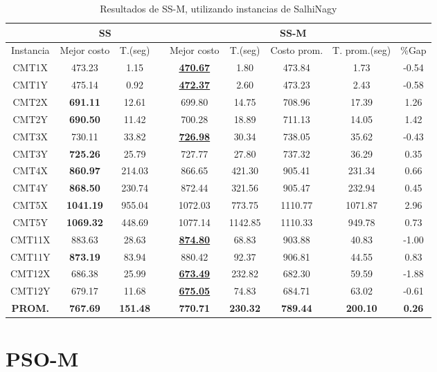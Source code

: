 \begin{table}[h]
\caption{ Resultados de SS-M, utilizando instancias de SalhiNagy}
\centering
\scriptsize
\begin{tabular*}{1.00\textwidth}{@{\extracolsep{\fill}} |c||c c||c c c c c c|}
\hline
 & \multicolumn{2}{c||}{\bf{SS}} & \multicolumn{6}{c|}{\bf{SS-M}}\\\hline
Instancia & Mejor costo & T.(seg) & & Mejor costo & T.(seg) & Costo prom. & T. prom.(seg) & \%Gap\\ [0.5ex]
\hline\hline
CMT1X & 473.23 & 1.15 & & \bf{\underline{470.67}} & 
1.80 & 473.84 & 1.73 & -0.54\\CMT1Y & 475.14 & 0.92 & & \bf{\underline{472.37}} & 
2.60 & 473.23 & 2.43 & -0.58\\CMT2X & \bf{691.11} & 12.61 & & 
699.80 & 14.75 & 708.96 & 17.39 & 1.26\\CMT2Y & \bf{690.50} & 11.42 & & 
700.28 & 18.89 & 711.13 & 14.05 & 1.42\\CMT3X & 730.11 & 33.82 & & \bf{\underline{726.98}} & 
30.34 & 738.05 & 35.62 & -0.43\\CMT3Y & \bf{725.26} & 25.79 & & 
727.77 & 27.80 & 737.32 & 36.29 & 0.35\\CMT4X & \bf{860.97} & 214.03 & & 
866.65 & 421.30 & 905.41 & 231.34 & 0.66\\CMT4Y & \bf{868.50} & 230.74 & & 
872.44 & 321.56 & 905.47 & 232.94 & 0.45\\CMT5X & \bf{1041.19} & 955.04 & & 
1072.03 & 773.75 & 1110.77 & 1071.87 & 2.96\\CMT5Y & \bf{1069.32} & 448.69 & & 
1077.14 & 1142.85 & 1110.33 & 949.78 & 0.73\\CMT11X & 883.63 & 28.63 & & \bf{\underline{874.80}} & 
68.83 & 903.88 & 40.83 & -1.00\\CMT11Y & \bf{873.19} & 83.94 & & 
880.42 & 92.37 & 906.81 & 44.55 & 0.83\\CMT12X & 686.38 & 25.99 & & \bf{\underline{673.49}} & 
232.82 & 682.30 & 59.59 & -1.88\\CMT12Y & 679.17 & 11.68 & & \bf{\underline{675.05}} & 
74.83 & 684.71 & 63.02 & -0.61\\\hline\hline\bf{PROM.} & 
\bf{767.69} & \bf{151.48} & & \bf{770.71} & \bf{230.32} & \bf{789.44} & \bf{200.10} & \bf{0.26}\\[1ex]\hline
\end{tabular*}
\label{apendice-table:finalS-SCA}
\end{table}
\clearpage
\section{PSO-M}\label{tablas-finales-pso}

